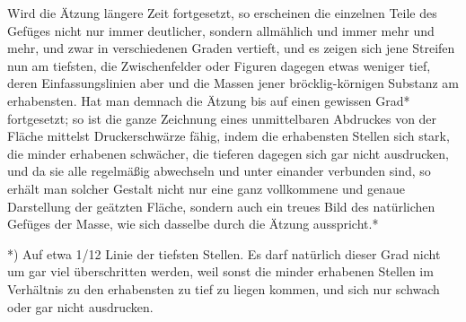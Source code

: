 \documentclass[a4paper, 11pt, oneside, german]{article}
\begin{document}
Wird die Ätzung längere Zeit fortgesetzt, so erscheinen die einzelnen Teile des Gefüges nicht nur immer deutlicher, sondern allmählich und immer mehr und mehr, und zwar in verschiedenen Graden vertieft, und es zeigen sich jene Streifen nun am tiefsten, die Zwischenfelder oder Figuren dagegen etwas weniger tief, deren Einfassungslinien aber und die Massen jener bröcklig-körnigen Substanz am erhabensten. Hat man demnach die Ätzung bis auf einen gewissen Grad* fortgesetzt; so ist die ganze Zeichnung eines unmittelbaren Abdruckes von der Fläche mittelst Druckerschwärze fähig, indem die erhabensten Stellen sich stark, die minder erhabenen schwächer, die tieferen dagegen sich gar nicht ausdrucken, und da sie alle regelmäßig abwechseln und unter einander verbunden sind, so erhält man solcher Gestalt nicht nur eine ganz vollkommene und genaue Darstellung der geätzten Fläche, sondern auch ein treues Bild des natürlichen Gefüges der Masse, wie sich dasselbe durch die Ätzung ausspricht.*

*) Auf etwa 1/12 Linie der tiefsten Stellen. Es darf natürlich dieser Grad nicht um gar viel überschritten werden, weil sonst die minder erhabenen Stellen im Verhältnis zu den erhabensten zu tief zu liegen kommen, und sich nur schwach oder gar nicht ausdrucken.
\end{document}
